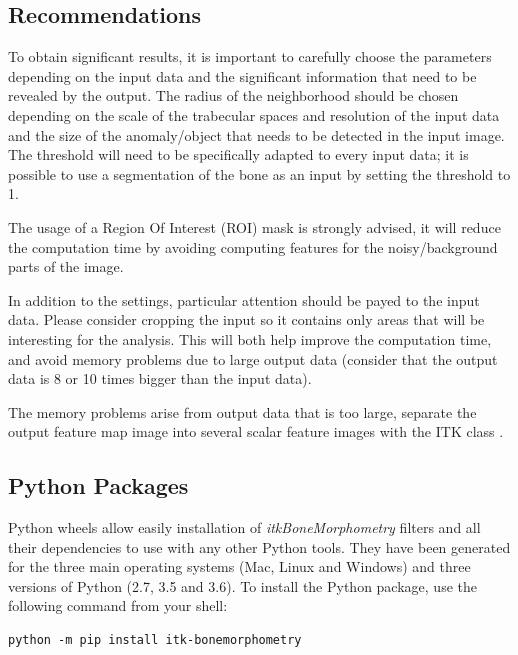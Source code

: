 \documentclass{InsightArticle}
\begin{document}
\subsection{Recommendations}
\label{sec:recommendations}

To obtain significant results, it is important to carefully choose the parameters depending on the input data and the significant information that need to be revealed by the output. The radius of the neighborhood should be chosen depending on the scale of the trabecular spaces and resolution of the input data and the size of the anomaly/object that needs to be detected in the input image. The threshold will need to be specifically adapted to every input data; it is possible to use a segmentation of the bone as an input by setting the threshold to 1.

The usage of a Region Of Interest (ROI) mask is strongly advised, it will reduce the computation time by avoiding computing features for the noisy/background parts of the image.

In addition to the settings, particular attention should be payed to the input data. Please consider cropping the input so it contains only areas that will be interesting for the analysis. This will both help improve the computation time, and avoid memory problems due to large output data (consider that the output data is 8 or 10 times bigger than the input data).

The memory problems arise from output data that is too large, separate the output feature map image into several scalar feature images with the ITK class .

\subsection{Python Packages}
\label{sec:PythonWheels}

Python wheels allow easily installation of \textit{itkBoneMorphometry} filters and all their dependencies to use with any other Python tools. They have been generated for the three main operating systems (Mac, Linux and Windows) and three versions of Python (2.7, 3.5 and 3.6). To install the Python package, use the following command from your shell:

\begin{verbatim}
python -m pip install itk-bonemorphometry
\end{verbatim}
\normalsize
\end{document}

